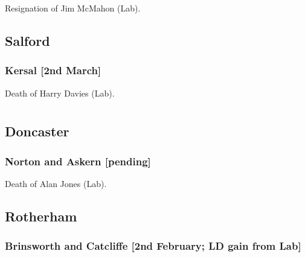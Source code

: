 \documentclass[a4paper,openany]{book}
\begin{document}
\begin{resultsiii}

Resignation of Jim McMahon (Lab).

\subsection*{Salford}

\subsubsection*{Kersal \hspace*{\fill}\nolinebreak[1]%
\enspace\hspace*{\fill}
[2nd March]}


Death of Harry Davies (Lab).

\section[South Yorkshire]{}

\subsection*{Doncaster}

\subsubsection*{Norton and Askern \hspace*{\fill}\nolinebreak[1]%
\enspace\hspace*{\fill}
[pending]}


Death of Alan Jones (Lab).

\subsection*{Rotherham}

\subsubsection*{Brinsworth and Catcliffe \hspace*{\fill}\nolinebreak[1]%
\enspace\hspace*{\fill}
[2nd February; LD gain from Lab]}


\end{resultsiii}
\end{document}
